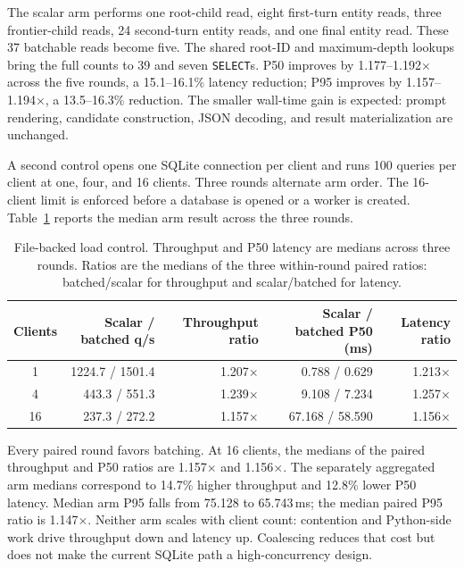 \documentclass[10pt]{article}
\newcommand{\code}[1]{\texttt{#1}}
\newcommand{\hdr}{\rowcolor{hdrgray}}
\newenvironment{ctab}{\par\smallskip\centering\small
  \setlength{\tabcolsep}{5pt}\renewcommand{\arraystretch}{1.12}}{\par\smallskip}
\begin{document}
The scalar arm performs one root-child read, eight first-turn entity reads,
three frontier-child reads, 24 second-turn entity reads, and one final entity
read. These 37 batchable reads become five. The shared root-ID and maximum-depth
lookups bring the full counts to 39 and seven \code{SELECT}s. P50 improves by
1.177--1.192$\times$ across the five rounds, a 15.1--16.1\% latency reduction;
P95 improves by 1.157--1.194$\times$, a 13.5--16.3\% reduction. The smaller
wall-time gain is expected:
prompt rendering, candidate construction, JSON decoding, and result
materialization are unchanged.

A second control opens one SQLite connection per client and runs 100 queries
per client at one, four, and 16 clients. Three rounds alternate arm order. The
16-client limit is enforced before a database is opened or a worker is
created. Table~\ref{tab:sqlite-beam-load} reports the median arm result across
the three rounds.

\begin{table}[H]
\caption{File-backed load control. Throughput and P50 latency are medians
across three rounds. Ratios are the medians of the three within-round paired
ratios: batched/scalar for throughput and scalar/batched for latency.}
\label{tab:sqlite-beam-load}
\begin{ctab}
\begin{tabular}{@{}crrrr@{}}
\toprule
\hdr Clients & Scalar / batched q/s & Throughput ratio &
Scalar / batched P50 (ms) & Latency ratio \\
\midrule
1  & 1224.7 / 1501.4 & 1.207$\times$ & 0.788 / 0.629 & 1.213$\times$ \\
4  & 443.3 / 551.3   & 1.239$\times$ & 9.108 / 7.234 & 1.257$\times$ \\
16 & 237.3 / 272.2   & 1.157$\times$ & 67.168 / 58.590 & 1.156$\times$ \\
\bottomrule
\end{tabular}
\end{ctab}
\end{table}

Every paired round favors batching. At 16 clients, the medians of the paired
throughput and P50 ratios are 1.157$\times$ and 1.156$\times$. The separately
aggregated arm medians correspond to 14.7\% higher throughput and 12.8\% lower
P50 latency. Median arm P95 falls from 75.128 to 65.743\,ms; the median paired
P95 ratio is 1.147$\times$. Neither arm scales with client count: contention and
Python-side work drive throughput down and latency up. Coalescing reduces that
cost but does not make the current SQLite path a high-concurrency design.
\end{document}

